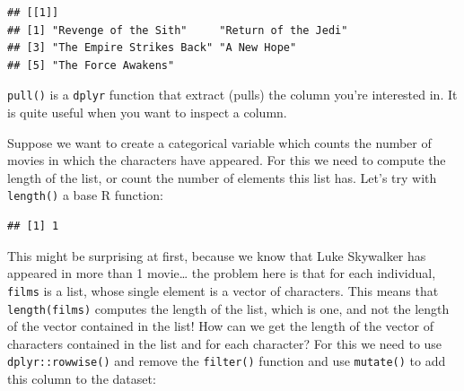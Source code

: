 \documentclass[]{gitbook}
\newenvironment{Shaded}{\begin{snugshade}}{\end{snugshade}}
\newcommand{\KeywordTok}[1]{\textcolor[rgb]{0.13,0.29,0.53}{\textbf{#1}}}
\newcommand{\NormalTok}[1]{#1}
\newcommand{\OperatorTok}[1]{\textcolor[rgb]{0.81,0.36,0.00}{\textbf{#1}}}
\newcommand{\StringTok}[1]{\textcolor[rgb]{0.31,0.60,0.02}{#1}}
\theoremstyle{definition}
\theoremstyle{definition}
\theoremstyle{definition}
\theoremstyle{remark}
\begin{document}
\begin{Shaded}
\end{Shaded}

\begin{verbatim}
## [[1]]
## [1] "Revenge of the Sith"     "Return of the Jedi"     
## [3] "The Empire Strikes Back" "A New Hope"             
## [5] "The Force Awakens"
\end{verbatim}

\texttt{pull()} is a \texttt{dplyr} function that extract (pulls) the
column you're interested in. It is quite useful when you want to inspect
a column.

Suppose we want to create a categorical variable which counts the number
of movies in which the characters have appeared. For this we need to
compute the length of the list, or count the number of elements this
list has. Let's try with \texttt{length()} a base R function:

\begin{Shaded}
\end{Shaded}

\begin{verbatim}
## [1] 1
\end{verbatim}

This might be surprising at first, because we know that Luke Skywalker
has appeared in more than 1 movie\ldots{} the problem here is that for
each individual, \texttt{films} is a list, whose single element is a
vector of characters. This means that \texttt{length(films)} computes
the length of the list, which is one, and not the length of the vector
contained in the list! How can we get the length of the vector of
characters contained in the list and for each character? For this we
need to use \texttt{dplyr::rowwise()} and remove the \texttt{filter()}
function and use \texttt{mutate()} to add this column to the dataset:
\end{document}

